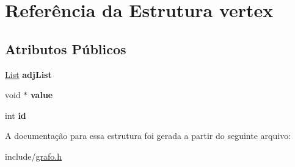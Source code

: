 \hypertarget{structvertex}{}\section{Referência da Estrutura vertex}
\label{structvertex}
\subsection*{Atributos Públicos}
\begin{DoxyCompactItemize}
\item 
\mbox{\label{structvertex_a30d637066c3489c97598af69394d187e}} 
\hyperlink{structlistNode}{List} {\bfseries adj\+List}
\item 
\mbox{\label{structvertex_aa610e7fdb75c270e113b935187b31276}} 
void $\ast$ {\bfseries value}
\item 
\mbox{\label{structvertex_a174bbdee712ca98fb591504ce66ed006}} 
int {\bfseries id}
\end{DoxyCompactItemize}


A documentação para essa estrutura foi gerada a partir do seguinte arquivo\+:\begin{DoxyCompactItemize}
\item 
include/\hyperlink{grafo_8h}{grafo.\+h}\end{DoxyCompactItemize}
